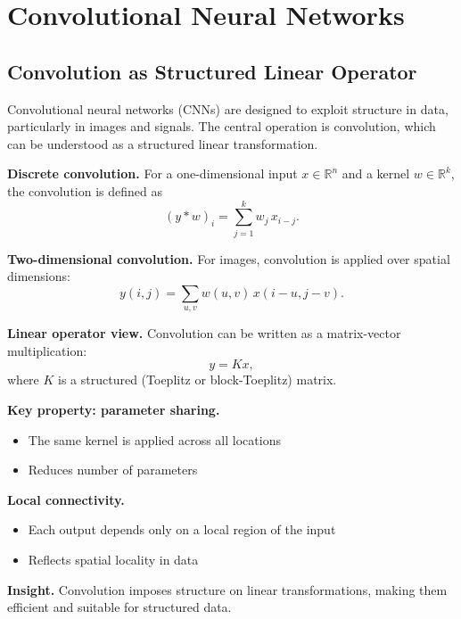 \chapter{Convolutional Neural Networks}

\section{Convolution as Structured Linear Operator}

Convolutional neural networks (CNNs) are designed to exploit structure in data, particularly in images and signals. The central operation is convolution, which can be understood as a structured linear transformation.

\medskip

\noindent
\textbf{Discrete convolution.}  
For a one-dimensional input $x \in \mathbb{R}^n$ and a kernel $w \in \mathbb{R}^k$, the convolution is defined as
\[
(y * w)_i = \sum_{j=1}^k w_j \, x_{i - j}.
\]

\medskip

\noindent
\textbf{Two-dimensional convolution.}  
For images, convolution is applied over spatial dimensions:
\[
y(i,j) = \sum_{u,v} w(u,v) \, x(i-u, j-v).
\]

\medskip

\noindent
\textbf{Linear operator view.}  
Convolution can be written as a matrix-vector multiplication:
\[
y = K x,
\]
where $K$ is a structured (Toeplitz or block-Toeplitz) matrix.

\medskip

\noindent
\textbf{Key property: parameter sharing.}
\begin{itemize}
    \item The same kernel is applied across all locations
    \item Reduces number of parameters
\end{itemize}

\medskip

\noindent
\textbf{Local connectivity.}
\begin{itemize}
    \item Each output depends only on a local region of the input
    \item Reflects spatial locality in data
\end{itemize}

\medskip

\noindent
\textbf{Insight.}  
Convolution imposes structure on linear transformations, making them efficient and suitable for structured data.

